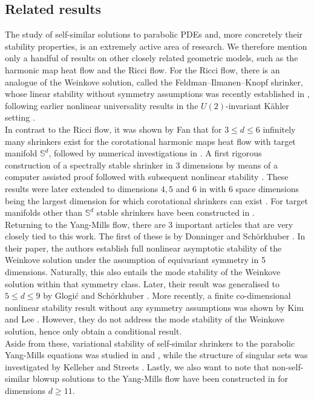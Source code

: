 \documentclass[11pt,reqno]{amsart}
\theoremstyle{remark}
\theoremstyle{definition}
\begin{document}
\subsection{Related results}
The study of self-similar solutions to parabolic PDEs and, more concretely their stability properties, is an extremely active area of research. We therefore mention only a handful of results on other closely related geometric models, such as the harmonic map heat flow and the Ricci flow. For the Ricci flow, there is an analogue of the Weinkove solution,
called the Feldman--Ilmanen--Knopf shrinker, whose linear stability without symmetry assumptions was recently established in \cite{NafOzu25}, following earlier nonlinear universality results in the $U(2)$-invariant K\"ahler setting \cite{Max14,BinJia16}.\\ 
In contrast to the Ricci flow, it was shown by Fan \cite{Fan19} that for $3\leq d\leq 6 $ infinitely many shrinkers exist for the corotational harmonic maps heat flow with target manifold $\mathbb S^d$, followed by numerical investigations in \cite{BieBiz11}. A first rigorous construction of a spectrally stable shrinker in 3 dimensions by means of a computer assisted proof followed \cite{BieDon18} with subsequent nonlinear stability \cite{BieDonSch17}. These results were later extended to dimensions $4,5$ and $6$ in \cite{AngKisSch26} with 6 space dimensions being the largest dimension for which corotational shrinkers can exist \cite{BizWas15}. For target manifolds other than $\mathbb
S^d$ stable shrinkers have been constructed in \cite{GloKisSch24}.
\\
Returning to the Yang-Mills flow, there are 3 important articles that are very closely tied to this work. The first of these is by Donninger and Schörkhuber \cite{DonSch19}. In their paper, the authors establish full nonlinear asymptotic stability of the Weinkove solution under the assumption of equivariant symmetry in 5 dimensions. Naturally, this also entails the mode stability of the Weinkove solution within that symmetry class. Later, their result was generalised to $5\leq d \leq 9$ by Glogić and Schörkhuber \cite{GloSch20}. More recently, a finite co-dimensional nonlinear stability result without any symmetry assumptions was shown by Kim and Lee \cite{KimLee24}. However, they do not address the mode stability of the Weinkove solution, hence only obtain a conditional result.
\\
Aside from these,  variational stability of self-similar shrinkers to the parabolic Yang-Mills equations was studied in \cite{CheZha15} and \cite{KelStr16}, while the structure of singular sets was investigated by Kelleher and Streets \cite{KelStr18}.
Lastly, we also want to note that non-self-similar blowup solutions to the Yang-Mills flow have been constructed in \cite{BenDuoGho25} for dimensions $d\geq 11$.
\end{document}
